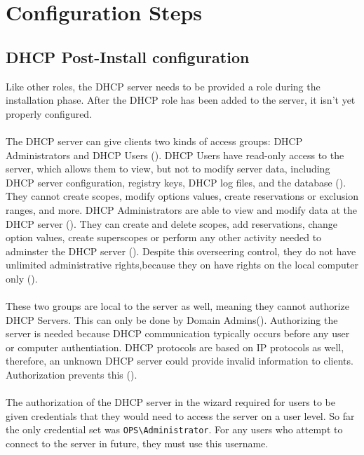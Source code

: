 \section{Configuration Steps}
\subsection{DHCP Post-Install configuration}
Like other roles, the DHCP server needs to be provided a role during the 
installation phase. After the DHCP role has been added to the server, 
it isn't yet properly configured. 

\paragraph{}
The DHCP server can give clients two kinds of access groups: DHCP Administrators and DHCP Users (\cite{DHCPgroups}).
DHCP Users have read-only access to the server, which allows them to view, but not to modify server data, including DHCP server 
configuration, registry keys, DHCP log files, and the database (\cite{DHCPgroups}). They cannot create scopes, modify options values, create 
reservations or exclusion ranges, and more.
DHCP Administrators are able to view and modify data at the DHCP server (\cite{DHCPgroups}). They can 
create and delete scopes, add reservations, change option values, create superscopes or perform
 any other activity needed to adminster the DHCP server (\cite{DHCPgroups}). Despite this overseering control, they do not 
have unlimited administrative rights,because they on have rights on the local computer only (\cite{DHCPgroups}). 

\paragraph{}
These two groups are local to the server as well, meaning they cannot authorize DHCP Servers. 
This can only be done by Domain Admins(\cite{DHCPgroups}). Authorizing the server is needed because DHCP communication typically occurs before any user
or computer authentiation. DHCP protocols are based on IP protocols as well, therefore, an unknown DHCP server could 
provide invalid information to clients. Authorization prevents this (\cite{DHCPauthor}).

\paragraph{}
The authorization of the DHCP server in the wizard required for users to be 
given credentials that they would need to access the server on a user level. So far the only 
credential set was \verb|OPS\Administrator|. For any users who attempt to 
connect to the server in future, they must use this username. 

